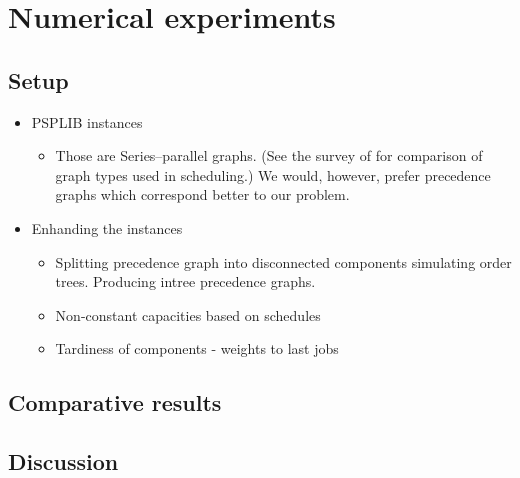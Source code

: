\chapter{Numerical experiments}

\section{Setup}

\begin{itemize}
    \item PSPLIB instances
    \begin{itemize}
        \item Those are Series–parallel graphs.
            (See the survey of \citep{PROT2017} for comparison of graph types used in scheduling.)
            We would, however, prefer precedence graphs which correspond better to our problem.
    \end{itemize}

    \item Enhanding the instances
    \begin{itemize}
        \item Splitting precedence graph into disconnected components simulating order trees.
            Producing intree precedence graphs.

        \item Non-constant capacities based on schedules
        \item Tardiness of components - weights to last jobs
    \end{itemize}
\end{itemize}

\section{Comparative results}

\section{Discussion}
